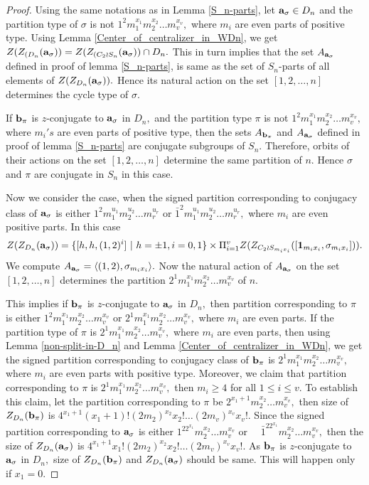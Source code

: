 \documentclass[12pt,twoside,reqno]{amsart}
\theoremstyle{definition}
\numberwithin{equation}{section}
\begin{document}
\begin{proof} Using the same notations as in Lemma \ref{S_n-parts}, let ${\bf a}_\sigma \in D_n$ and the partition type of $\sigma$ is not $1^2m_1^{x_1}m_2^{x_2}\dots m_v^{x_v},$  where $m_i$ are even parts of positive type. Using Lemma \ref{Center_of_centralizer_in_WDn}, we get $Z(Z_{(D_n}({\bf a}_\sigma))=Z(Z_{(C_2 \wr S_n}({\bf a}_\sigma)) \cap D_n.$ This in turn implies that the set $A_{{\bf a}_\sigma}$ defined in proof of lemma \ref{S_n-parts}, is same as the set of $S_n$-parts of all elements of $Z(Z_{D_n}({\bf a}_\sigma)).$ Hence its natural action on the  set $[1,2, \dots, n]$ determines the cycle type of $\sigma.$ 

If ${\bf b}_\pi$ is $z$-conjugate to ${\bf a}_\sigma$ in $D_n,$ and the partition type $\pi$ is not $1^2m_1^{x_1}m_2^{x_2}\dots m_v^{x_v},$ where $m_i's$  are even parts of positive type, then the sets  $A_{{\bf b}_\pi}$ and $A_{{\bf a}_\sigma}$ defined in proof of lemma \ref{S_n-parts} are conjugate subgroups of $S_n.$ Therefore, orbits of  their actions on the  set $[1,2, \dots, n]$ determine the same partition of $n.$ Hence $\sigma$ and $\pi$ are conjugate in $S_n$ in this case.

Now we consider the case, when the signed partition corresponding to conjugacy class of  ${\bf a}_\sigma$ is either $1^2m_1^{u_1}m_2^{u_2}\dots m_r^{u_r}$ or $\bar{1}^2m_1^{u_1}m_2^{u_2}\dots m_r^{u_r},$ where $m_i$ are even positive parts. In this case
 $$ Z(Z_{D_n}({\bf a}_\sigma)) =\{[h,h, (1,2)^i]~|~h=\pm1, i=0,1\} \times \Pi_{i=1}^v Z(Z_{C_2 \wr S_{m_ix_i}} ([{\bf 1}_{m_ix_i}, \sigma_{m_ix_i}])).$$
 We compute $A_{\bf{a}_\sigma} = \langle (1,2), \sigma_{m_ix_i} \rangle. $ Now the natural action of $A_{\bf{a}_\sigma}$ on the set $[1,2,\dots, n]$ determines the partition $2^1m_1^{x_1}m_2^{x_2}\dots m_v^{x_v}$ of $n.$ 
 
 This implies if ${\bf b}_\pi$ is $z$-conjugate to ${\bf a}_\sigma$ in $D_n,$ then partition corresponding to $\pi$ is either $1^2m_1^{x_1}m_2^{x_2}\dots m_v^{x_v}$ or $2^1m_1^{x_1}m_2^{x_2}\dots m_v^{x_v},$ where $m_i$ are even parts. If the partition type of $\pi$ is $2^1m_1^{x_1}m_2^{x_2}\dots m_v^{x_v},$ where $m_i$ are even parts, then using Lemma \ref{non-split-in-D_n} and Lemma \ref{Center_of_centralizer_in_WDn}, we get the signed partition corresponding to conjugacy class of ${\bf b}_\pi$ is $2^1m_1^{x_1}m_2^{x_2}\dots m_v^{x_v},$ where $m_i$ are even parts with positive type.  Moreover, we claim that partition corresponding to $\pi$ is $2^1m_1^{x_1}m_2^{x_2}\dots m_v^{x_v},$ then $m_i\geq 4$ for all $1\leq i\leq v.$ To establish this claim, let the partition corresponding to $\pi$ be $2^{x_1+1}m_2^{x_2}\dots m_v^{x_v},$ then size of $Z_{D_n}({\bf b}_\pi)$ is $4^{x_1+1}(x_1+1)! (2m_2)^{x_2} x_2! \dots (2m_v)^{x_v} x_v!.$ Since the signed partition corresponding to ${\bf a}_\sigma$ is either $1^22^{x_1}m_2^{x_2}\dots m_v^{x_v}$ or~~ $\bar{1}^22^{x_1}m_2^{x_2}\dots m_v^{x_v},$ then 
 the size of $Z_{D_n}({\bf a}_\sigma)$ is $4^{x_1+1} x_1!(2m_2)^{x_2} x_2! \dots (2m_v)^{x_v} x_v!.$ As ${\bf b}_\pi$ is $z$-conjugate to ${\bf a}_\sigma$ in $D_n,$ size of $Z_{D_n}({\bf b}_\pi)$ and $Z_{D_n}({\bf a}_\sigma)$ should be same. This will happen only if $x_1=0.$ 
 \end{proof}
\end{document}
